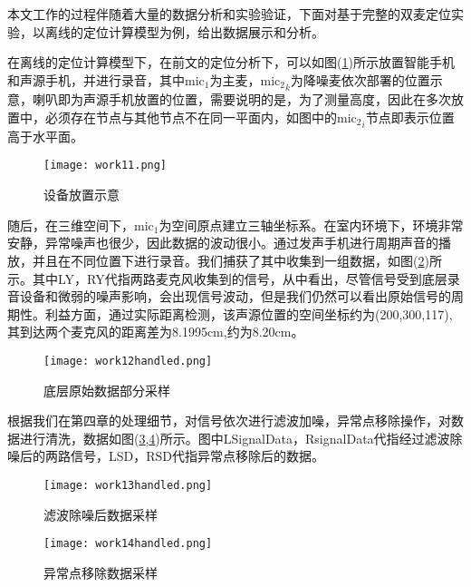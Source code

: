 \documentclass[winfonts,oneside]{njuthesis}
\begin{document}
		本文工作的过程伴随着大量的数据分析和实验验证，下面对基于完整的双麦定位实验，以离线的定位计算模型为例，给出数据展示和分析。
		
		在离线的定位计算模型下，在前文的定位分析下，可以如图(\ref{fig: work11})所示放置智能手机和声源手机，并进行录音，其中$\text{mic}_1$为主麦，${\text{mic}_2}_k$为降噪麦依次部署的位置示意，喇叭即为声源手机放置的位置，需要说明的是，为了测量高度，因此在多次放置中，必须存在节点与其他节点不在同一平面内，如图中的${\text{mic}_2}_i$节点即表示位置高于水平面。
			
		\begin{figure}[H]
			\centering
			\texttt{[image: work11.png]}
			\caption{设备放置示意}
			\label{fig: work11}
		\end{figure}
			
		随后，在三维空间下，$\text{mic}_1$为空间原点建立三轴坐标系。在室内环境下，环境非常安静，异常噪声也很少，因此数据的波动很小。通过发声手机进行周期声音的播放，并且在不同位置下进行录音。我们捕获了其中收集到一组数据，如图(\ref{fig: work12})所示。其中LY，RY代指两路麦克风收集到的信号，从中看出，尽管信号受到底层录音设备和微弱的噪声影响，会出现信号波动，但是我们仍然可以看出原始信号的周期性。利益方面，通过实际距离检测，该声源位置的空间坐标约为(200,300,117),其到达两个麦克风的距离差为8.1995cm,约为8.20cm。
			
		\begin{figure}[H]
			\centering
			\texttt{[image: work12handled.png]}
			\caption{底层原始数据部分采样}
			\label{fig: work12}
		\end{figure}
	
		根据我们在第四章的处理细节，对信号依次进行滤波加噪，异常点移除操作，对数据进行清洗，数据如图(\ref{fig: work13},\ref{fig: work14})所示。图中LSignalData，RsignalData代指经过滤波除噪后的两路信号，LSD，RSD代指异常点移除后的数据。
		
		\begin{figure}[H]
			\centering
			\texttt{[image: work13handled.png]}
			\caption{滤波除噪后数据采样}
			\label{fig: work13}
		\end{figure}
	
	
		\begin{figure}[H]
			\centering
			\texttt{[image: work14handled.png]}
			\caption{异常点移除数据采样}
			\label{fig: work14}
		\end{figure}
\end{document}
